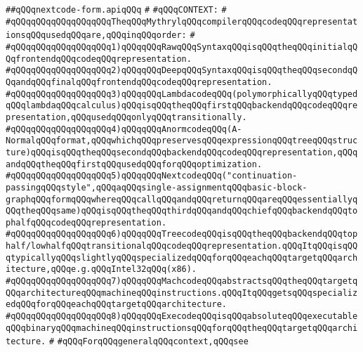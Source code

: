 \label{src/lib/compiler/back/top/nextcode/nextcode-form.api}
\verb|##qQQqnextcode-form.apiqQQq|\newline
\verb|#|\newline
\verb|#qQQqCONTEXT:|\newline
\verb|#|\newline
\verb|#qQQqqQQqqQQqqQQqqQQqTheqQQqMythrylqQQqcompilerqQQqcodeqQQqrepresentationsqQQqusedqQQqare,qQQqinqQQqorder:|\newline
\verb|#|\newline
\verb|#qQQqqQQqqQQqqQQqqQQq1)qQQqqQQqRawqQQqSyntaxqQQqisqQQqtheqQQqinitialqQQqfrontendqQQqcodeqQQqrepresentation.|\newline
\verb|#qQQqqQQqqQQqqQQqqQQq2)qQQqqQQqDeepqQQqSyntaxqQQqisqQQqtheqQQqsecondqQQqandqQQqfinalqQQqfrontendqQQqcodeqQQqrepresentation.|\newline
\verb|#qQQqqQQqqQQqqQQqqQQq3)qQQqqQQqLambdacodeqQQq(polymorphicallyqQQqtypedqQQqlambdaqQQqcalculus)qQQqisqQQqtheqQQqfirstqQQqbackendqQQqcodeqQQqrepresentation,qQQqusedqQQqonlyqQQqtransitionally.|\newline
\verb|#qQQqqQQqqQQqqQQqqQQq4)qQQqqQQqAnormcodeqQQq(A-NormalqQQqformat,qQQqwhichqQQqpreservesqQQqexpressionqQQqtreeqQQqstructure)qQQqisqQQqtheqQQqsecondqQQqbackendqQQqcodeqQQqrepresentation,qQQqandqQQqtheqQQqfirstqQQqusedqQQqforqQQqoptimization.|\newline
\verb|#qQQqqQQqqQQqqQQqqQQq5)qQQqqQQqNextcodeqQQq("continuation-passingqQQqstyle",qQQqaqQQqsingle-assignmentqQQqbasic-block-graphqQQqformqQQqwhereqQQqcallqQQqandqQQqreturnqQQqareqQQqessentiallyqQQqtheqQQqsame)qQQqisqQQqtheqQQqthirdqQQqandqQQqchiefqQQqbackendqQQqtophalfqQQqcodeqQQqrepresentation.|\newline
\verb|#qQQqqQQqqQQqqQQqqQQq6)qQQqqQQqTreecodeqQQqisqQQqtheqQQqbackendqQQqtophalf/lowhalfqQQqtransitionalqQQqcodeqQQqrepresentation.qQQqItqQQqisqQQqtypicallyqQQqslightlyqQQqspecializedqQQqforqQQqeachqQQqtargetqQQqarchitecture,qQQqe.g.qQQqIntel32qQQq(x86).|\newline
\verb|#qQQqqQQqqQQqqQQqqQQq7)qQQqqQQqMachcodeqQQqabstractsqQQqtheqQQqtargetqQQqarchitectureqQQqmachineqQQqinstructions.qQQqItqQQqgetsqQQqspecializedqQQqforqQQqeachqQQqtargetqQQqarchitecture.|\newline
\verb|#qQQqqQQqqQQqqQQqqQQq8)qQQqqQQqExecodeqQQqisqQQqabsoluteqQQqexecutableqQQqbinaryqQQqmachineqQQqinstructionsqQQqforqQQqtheqQQqtargetqQQqarchitecture.|\newline
\verb|#|\newline
\verb|#qQQqForqQQqgeneralqQQqcontext,qQQqsee|\newline
